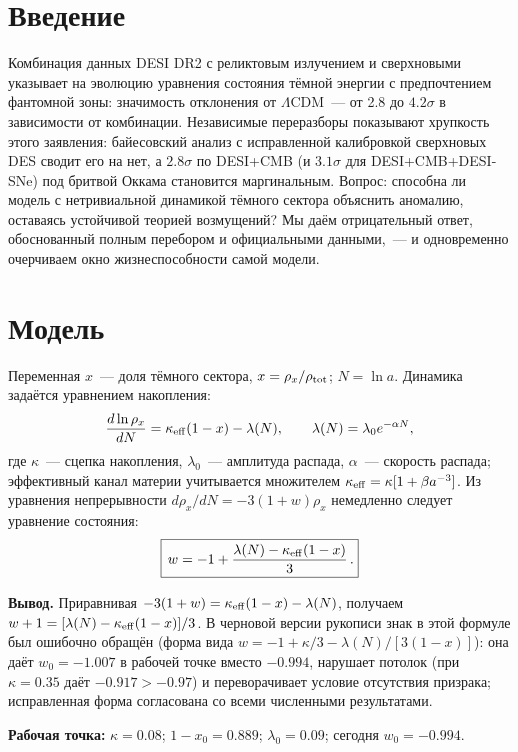 \documentclass[11pt,a4paper]{article}
\begin{document}
\section{Введение}
Комбинация данных DESI DR2 с реликтовым излучением и сверхновыми указывает на эволюцию уравнения состояния тёмной энергии с предпочтением фантомной зоны: значимость отклонения от $\Lambda$CDM~--- от 2.8 до $4.2\sigma$ в зависимости от комбинации. Независимые переразборы показывают хрупкость этого заявления: байесовский анализ с исправленной калибровкой сверхновых DES сводит его на нет, а $2.8\sigma$ по DESI+CMB (и $3.1\sigma$ для DESI+CMB+DESI-SNe) под бритвой Оккама становится маргинальным. Вопрос: способна ли модель с нетривиальной динамикой тёмного сектора объяснить аномалию, оставаясь устойчивой теорией возмущений? Мы даём отрицательный ответ, обоснованный полным перебором и официальными данными,~--- и одновременно очерчиваем окно жизнеспособности самой модели.

\section{Модель}
Переменная $x$~--- доля тёмного сектора, $x=\rho_x/\rho_{\rm tot}$; $N=\ln a$. Динамика задаётся уравнением накопления:
\begin{equation}
\frac{d\ln\rho_x}{dN}=\kappa_{\rm eff}(1-x)-\lambda(N),\qquad
\lambda(N)=\lambda_0 e^{-\alpha N},
\label{eq:accum}
\end{equation}
где $\kappa$~--- сцепка накопления, $\lambda_0$~--- амплитуда распада, $\alpha$~--- скорость распада; эффективный канал материи учитывается множителем $\kappa_{\rm eff}=\kappa[1+\beta a^{-3}]$. Из уравнения непрерывности $d\rho_x/dN=-3(1+w)\rho_x$ немедленно следует уравнение состояния:
\begin{equation}
\boxed{\,w=-1+\frac{\lambda(N)-\kappa_{\rm eff}(1-x)}{3}\,.}
\label{eq:w}
\end{equation}

\textbf{Вывод.} Приравнивая $-3(1+w)=\kappa_{\rm eff}(1-x)-\lambda(N)$, получаем $w+1=[\lambda(N)-\kappa_{\rm eff}(1-x)]/3$. В черновой версии рукописи знак в этой формуле был ошибочно обращён (форма вида $w=-1+\kappa/3-\lambda(N)/[3(1-x)]$): она даёт $w_0=-1.007$ в рабочей точке вместо $-0.994$, нарушает потолок (при $\kappa=0.35$ даёт $-0.917>-0.97$) и переворачивает условие отсутствия призрака; исправленная форма согласована со всеми численными результатами.

\textbf{Рабочая точка:} $\kappa=0.08$; $1-x_0=0.889$; $\lambda_0=0.09$; сегодня $w_0=-0.994$.
\end{document}
